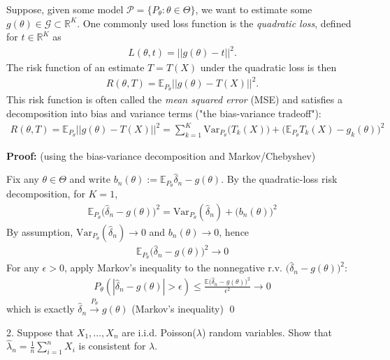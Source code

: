 \documentclass[10pt]{article}
\begin{document}
Suppose, given some model $\mathcal{P} = \{P_\theta : \theta\in\Theta\}$, we want to estimate some $g(\theta)\in \mathcal{G}\subset \mathbb{R}^K $. One commonly used loss function is the \textit{quadratic loss}, defined for $t\in \mathbb{R}^K $ as 
\begin{gather*}
    L(\theta, t) = ||g(\theta) - t||^2.
\end{gather*}
The risk function of an estimate $T = T(X)$ under the quadratic loss is then 
\begin{gather*}
    R(\theta, T) = \mathbb{E}_{P_\theta}||g(\theta) - T(X)||^2.
\end{gather*}
This risk function is often called the \textit{mean squared error} (MSE) and satisfies a decomposition into bias and variance terms ("the bias-variance tradeoff"):
\begin{gather*}
    R(\theta, T) = \mathbb{E}_{P_\theta}||g(\theta) - T(X)||^2 = \sum_{k = 1}^{K}\text{Var}_{P_\theta}\big(T_k(X)\big) + \big(\mathbb{E}_{P_\theta}T_k(X) - g_k(\theta)\big)^2
\end{gather*}

\textbf{Proof:} (using the bias-variance decomposition and Markov/Chebyshev)

Fix any $\theta\in\Theta $ and write $b_n(\theta) := \mathbb{E}_{P_\theta}\hat{\delta}_n - g(\theta)$. By the quadratic-loss risk decomposition, for $K = 1 $,
\begin{gather*}
    \mathbb{E}_{P_\theta}\big(\hat{\delta}_n - g(\theta)\big)^2 = \text{Var}_{P_\theta}(\hat{\delta}_n) + \big(b_n(\theta)\big)^2
\end{gather*}
By assumption, $\text{Var}_{P_\theta}(\hat{\delta}_n) \to 0 $ and $b_n(\theta) \to 0 $, hence 
\begin{gather*}
    \mathbb{E}_{P_\theta}\big(\hat{\delta}_n - g(\theta)\big)^2 \longrightarrow 0
\end{gather*}
For any $\epsilon > 0 $, apply Markov's inequality to the nonnegative r.v. $\big(\hat{\delta}_n - g(\theta)\big)^2 $:
\begin{gather*}
    P_\theta(|\hat{\delta}_n - g(\theta)| > \epsilon) \le \frac{\mathbb{E}\big(\hat{\delta}_n - g(\theta)\big)^2}{\epsilon^2} \longrightarrow 0
\end{gather*}
which is exactly $\hat{\delta}_n \xrightarrow{P_\theta} g(\theta)$ (Markov's inequality) \qed

\newpage 

2. Suppose that $X_1, …, X_n $ are i.i.d. Poisson($\lambda $) random variables. Show that $\hat{\lambda}_n = \frac{1}{n}\sum_{i = 1}^{n}X_i $ is consistent for $\lambda $.
\end{document}

